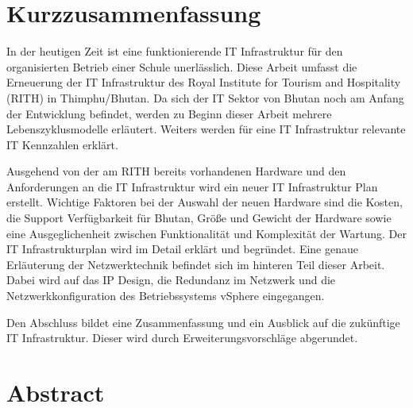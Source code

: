 \thispagestyle{empty}
\pagestyle{empty}

%
%

\section*{\Large\bfseries Kurzzusammenfassung}

In der heutigen Zeit ist eine funktionierende IT Infrastruktur für den organisierten Betrieb einer Schule unerlässlich. Diese Arbeit umfasst die Erneuerung der IT Infrastruktur des Royal Institute for Tourism and Hospitality (RITH) in Thimphu/Bhutan. Da sich der IT Sektor von Bhutan noch am Anfang der Entwicklung befindet, werden zu Beginn dieser Arbeit mehrere Lebenszyklusmodelle erläutert. Weiters werden für eine IT Infrastruktur relevante IT Kennzahlen erklärt. 

Ausgehend von der am RITH bereits vorhandenen Hardware und den Anforderungen an die IT Infrastruktur wird ein neuer IT Infrastruktur Plan erstellt. Wichtige Faktoren bei der Auswahl der neuen Hardware sind die Kosten, die Support Verfügbarkeit für Bhutan, Größe und Gewicht der Hardware sowie eine Ausgeglichenheit zwischen Funktionalität und Komplexität der Wartung. Der IT Infrastrukturplan wird im Detail erklärt und begründet. Eine genaue Erläuterung der Netzwerktechnik befindet sich im hinteren Teil dieser Arbeit. Dabei wird auf das IP Design, die Redundanz im Netzwerk und die Netzwerkkonfiguration des Betriebssystems vSphere eingegangen. 

Den Abschluss bildet eine Zusammenfassung und ein Ausblick auf die zukünftige IT Infrastruktur. Dieser wird durch Erweiterungsvorschläge abgerundet.

\section*{\Large\bfseries Abstract}

